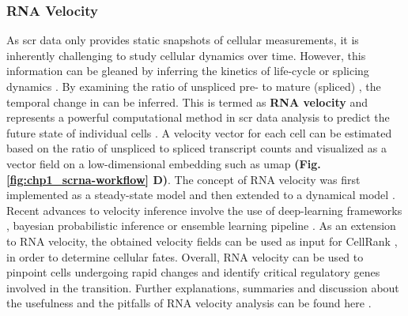 \subsubsection{RNA Velocity}
As \gls{scr} data only provides static snapshots of cellular measurements, it is inherently challenging to study cellular dynamics over time. However, this information can be gleaned by inferring the kinetics of  life-cycle or splicing dynamics%
. By examining the ratio of unspliced pre- to mature (spliced) , the temporal change in  can be inferred. This is termed as \textbf{RNA velocity} and represents a powerful computational method in \gls{scr} data analysis to predict the future state of individual cells \textbf{\cite{weiler_guide_2022}}. A velocity vector for each cell can be estimated based on the ratio of unspliced to spliced transcript counts and visualized as a vector field on a low-dimensional embedding such as \gls{umap} \textbf{(Fig. \ref{fig:chp1_scrna-workflow} D)}. The concept of RNA velocity was first implemented as a steady-state model \textbf{\cite{la_manno_rna_2018}} and then extended to a dynamical model \textbf{\cite{bergen_generalizing_2020}}. Recent advances to velocity inference involve the use of deep-learning frameworks \textbf{\cite{li_relay_2024}}, bayesian probabilistic inference \textbf{\cite{qin_pyro-velocity_2022}} or ensemble learning pipeline \textbf{\cite{wang_velo-predictor_2021}}. 
As an extension to RNA velocity, the obtained velocity fields can be used as input for CellRank \textbf{\cite{lange_cellrank_2022}}, in order to determine cellular fates. Overall, RNA velocity can be used to pinpoint cells undergoing rapid changes and identify critical regulatory genes involved in the transition. Further explanations, summaries and discussion about the usefulness and the pitfalls of RNA velocity analysis can be found here \textbf{\cite{bergen_rna_2021,zheng_pumping_2022}}.

